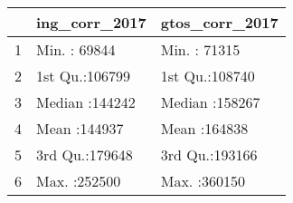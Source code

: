 \begin{table}[ht]
\centering
\begin{tabular}{rll}
  \hline
 & ing\_corr\_2017 & gtos\_corr\_2017 \\ 
  \hline
1 & Min.   : 69844   & Min.   : 71315   \\ 
  2 & 1st Qu.:106799   & 1st Qu.:108740   \\ 
  3 & Median :144242   & Median :158267   \\ 
  4 & Mean   :144937   & Mean   :164838   \\ 
  5 & 3rd Qu.:179648   & 3rd Qu.:193166   \\ 
  6 & Max.   :252500   & Max.   :360150   \\ 
   \hline
\end{tabular}
\end{table}

